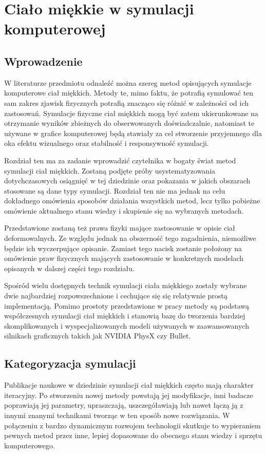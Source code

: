 \chapter{Ciało miękkie w symulacji komputerowej}

\section{Wprowadzenie}

W literaturze przedmiotu odnaleźć można szereg metod opisujących symulacje komputerowe ciał
miękkich. Metody te, mimo faktu, że potrafią symulować ten sam zakres zjawisk
fizycznych potrafią znacząco się różnić w zależności od ich zastosowań.
Symulacje fizyczne ciał miękkich mogą być zatem ukierunkowane na otrzymanie wyników
zbieżnych do obserwowanych doświadczalnie, natomiast te używane w grafice
komputerowej będą stawiały za cel stworzenie przyjemnego dla oka efektu
wizualnego oraz stabilność i responsywność symulacji.

Rozdział ten ma za zadanie wprowadzić czytelnika w bogaty świat metod symulacji
ciał miękkich. Zostaną podjęte próby usystematyzowania dotychczasowych
osiągnięć w tej dziedzinie oraz pokazania w jakich obszarach stosowane są
dane typy symulacji. Rozdział ten nie ma jednak na celu dokładnego omówienia sposobów 
działania wszystkich metod, lecz tylko pobieżne omówienie aktualnego stanu
wiedzy i skupienie się na wybranych metodach.

Przedstawione zostaną też prawa fizyki mające zastosowanie w opisie ciał deformowalnych. Ze
względu jednak na obszerność tego zagadnienia, 
niemożliwe będzie ich wyczerpujące opisanie. Zamiast tego nacisk
zostanie położony na omówienie praw fizycznych mających zastosowanie w
konkretnych modelach opisanych w dalszej części tego rozdziału.

Spośród wielu dostępnych technik symulacji ciała miękkiego zostały wybrane
dwie najbardziej rozpowszechnione i cechujące się się
relatywnie prostą implementacją. Pomimo prostoty przedstawione w pracy
metody są podstawą współczesnych symulacji ciał
miękkich i stanowią bazę do tworzenia bardziej skomplikowanych i 
wyspecjalizowanych modeli używanych w zaawansowanych silnikach graficznych
takich jak NVIDIA PhysX czy Bullet.

\section{Kategoryzacja symulacji}

Publikacje naukowe w dziedzinie symulacji ciał miękkich często mają charakter
iteracyjny. Po stworzeniu nowej metody powstają jej modyfikacje, inni badacze
poprawiają jej parametry, upraszczają,
uszczegóławiają lub nawet łączą ją z innymi znanymi technikami tworząc w ten
sposób nowe rozwiązania. W połączeniu z bardzo dynamicznym rozwojem technologii 
skutkuje to wypieraniem pewnych metod przez inne, lepiej dopasowane do obecnego
stanu wiedzy i sprzętu komputerowego.


